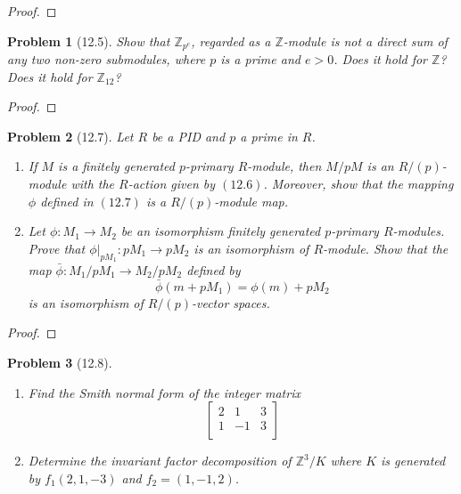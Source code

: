 \documentclass[10pt]{article}
\newcommand{\sk}{\vskip 10mm}
\newcommand{\bb}[1]{\mathbb{#1}}
\theoremstyle{plain}
\newtheorem{problem}{Problem}
\theoremstyle{remark}
\begin{document}
\begin{proof}
  
\end{proof}

\sk

\begin{problem}[12.5]
  Show that $\bb{Z}_{p^e}$, regarded as a $\bb{Z}$-module is not a
  direct sum of any two non-zero submodules, where $p$ is a prime and
  $e>0$. Does it hold for $\bb{Z}$? Does it hold for $\bb{Z}_{12}$?
\end{problem}

\begin{proof}
  
\end{proof}

\sk

\begin{problem}[12.7]
  Let $R$ be a PID and $p$ a prime in $R$.
  \begin{enumerate}
  \item If $M$ is a finitely generated $p$-primary $R$-module, then
    $M/pM$ is an $R/(p)$-module with the $R$-action given by $(12.6)$.
    Moreover, show that the mapping $\phi$ defined in $(12.7)$ is a
    $R/(p)$-module map.
  \item Let $\phi:M_1\rightarrow M_2$ be an isomorphism finitely generated $p$-primary
    $R$-modules. Prove that $\phi|_{pM_1}:pM_1\rightarrow pM_2$ is an isomorphism
    of $R$-module. Show that the map $\bar{\phi}:M_1/pM_1\rightarrow M_2/pM_2$ defined by
    \[ \bar{\phi}(m+pM_1)=\phi(m)+pM_2\]
    is an isomorphism of $R/(p)$-vector spaces.
  \end{enumerate}
\end{problem}

\begin{proof}
  
\end{proof}

\sk

\begin{problem}[12.8]
  \begin{enumerate}
  \item Find the Smith normal form of the integer matrix
    \[
      \left[
        \begin{array}{ccc}
          2&1&3\\
          1&-1&3\\
        \end{array}
      \right]
    \]
  \item Determine the invariant factor decomposition of $\bb{Z}^3/K$ where
    $K$ is generated by $f_1(2,1,-3)$ and $f_2=(1,-1,2)$.
  \end{enumerate}
\end{problem}
\end{document}
